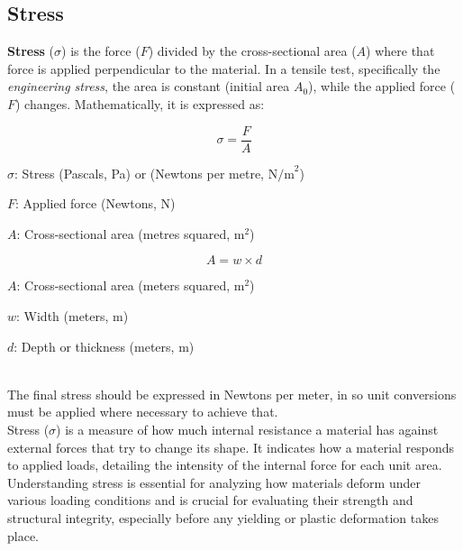 \documentclass{article}
\newcommand{\wm}[1]{%
	\begin{minipage}{1\textwidth}
		#1
	\end{minipage}%
}
\begin{document}
    \newpage
     \subsection{Stress}
     \textbf{Stress} ($\sigma$) is the force (\(F\)) divided by the cross-sectional area (\(A\)) where that force is applied perpendicular to the material. In a tensile test, specifically the \textit{engineering stress}, the area is constant (initial area $A_0$), while the applied force ($F$) changes. Mathematically, it is expressed as:\\[8pt]
    \begin{minipage}{0.46\textwidth}
            \begin{equation}
                \sigma = \frac{F}{A}
                \label{eq:stress}
            \end{equation}
            \begin{itemize}[left=0pt,itemsep=-1mm]
            \wm{\item \(\sigma\): Stress (Pascals, Pa) or (Newtons per metre, \(\text{N/m}^2\))}
            \wm{\item \(F\): Applied force (Newtons, N)}
            \wm{\item \(A\): Cross-sectional area (metres squared, \(\text{m}^2\))}
            \end{itemize}
        \end{minipage}\hfill
        \begin{minipage}{0.47\textwidth}
            \begin{equation}
                A = w \times d
                \label{eq:csa}
            \end{equation}
            \begin{itemize}[left=0pt,itemsep=-1mm]
                \wm{\item \(A\): Cross-sectional area (meters squared, \(\text{m}^2\))}
                \wm{\item \(w\): Width (meters, \(\text{m}\))}
                \wm{\item \(d\): Depth or thickness (meters, \(\text{m}\))}            
            \end{itemize}
        \end{minipage}\\[8pt]
        The final stress should be expressed in Newtons per meter, in so unit conversions must be applied where necessary to achieve that.\\[8pt]
        Stress ($\sigma$) is a measure of how much internal resistance a material has against external forces that try to change its shape. It indicates how a material responds to applied loads, detailing the intensity of the internal force for each unit area.\\[8pt]
        Understanding stress is essential for analyzing how materials deform under various loading conditions and is crucial for evaluating their strength and structural integrity, especially before any yielding or plastic deformation takes place.        
\end{document}

